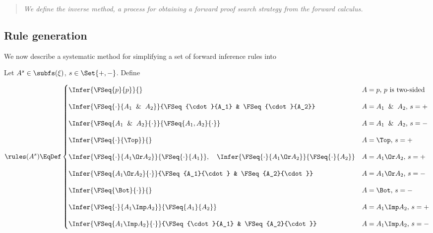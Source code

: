 \begin{quote}
  \textit{
    We define the inverse method, a process for obtaining a forward
    proof search strategy from the forward calculus.
  }
\end{quote}

\subsection{Rule generation}

We now describe a systematic method for simplifying a set of
forward inference rules into

\begin{definition}

\end{definition}

\begin{definition}
  Let $A^s\in\subfs(\xi)$, $s\in\Set{+,-}$.  Define

  \[
  \rules(A^s) \EqDef
  \begin{cases}
    \Infer{\FSeq{p}{p}}{} &
    \mbox{$A=p$, $p$ is two-sided}
    \\[1em]
    \Infer
    {\FSeq{\cdot}{A_1\And A_2}}
    {\FSeq{\cdot}{A_1} & \FSeq{\cdot}{A_2}} &
    \mbox{$A=A_1\And A_2$, $s=+$}
    \\[1em]
    \Infer
    {\FSeq{A_1\And A_2}{\cdot}}
    {\FSeq{A_1, A_2}{\cdot}} &
    \mbox{$A=A_1\And A_2$, $s=-$}
    \\[1em]
    \Infer
    {\FSeq{\cdot}{\Top}}
    {} &
    \mbox{$A=\Top$, $s=+$}
    \\[1em]
    \Infer
    {\FSeq{\cdot}{A_1\Or A_2}}
    {\FSeq{\cdot}{A_1}}
    ,\hspace{1em}
    \Infer
    {\FSeq{\cdot}{A_1\Or A_2}}
    {\FSeq{\cdot}{A_2}} &
    \mbox{$A=A_1\Or A_2$, $s=+$}
    \\[1em]
    \Infer
    {\FSeq{A_1\Or A_2}{\cdot}}
    {\FSeq{A_1}{\cdot} & \FSeq{A_2}{\cdot}} &
    \mbox{$A=A_1\Or A_2$, $s=-$}
    \\[1em]
    \Infer
    {\FSeq{\Bot}{\cdot}}
    {} &
    \mbox{$A=\Bot$, $s=-$}
    \\[1em]
    \Infer
    {\FSeq{\cdot}{A_1\Imp A_2}}
    {\FSeq{A_1}{A_2}} &
    \mbox{$A=A_1\Imp A_2$, $s=+$}
    \\[1em]
    \Infer
    {\FSeq{A_1\Imp A_2}{\cdot}}
    {\FSeq{\cdot}{A_1} & \FSeq{A_2}{\cdot}} &
    \mbox{$A=A_1\Imp A_2$, $s=-$}
   \end{cases}
  \]
\end{definition}

